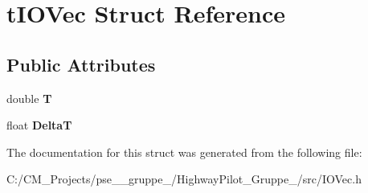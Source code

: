 \hypertarget{structt_i_o_vec}{}\section{t\+I\+O\+Vec Struct Reference}
\label{structt_i_o_vec}
\subsection*{Public Attributes}
\begin{DoxyCompactItemize}
\item 
\mbox{\label{structt_i_o_vec_a574678096931ac20b336a639997965fc}} 
double {\bfseries T}
\item 
\mbox{\label{structt_i_o_vec_a3ac90cd1a8280f296d5cf56b26856eda}} 
float {\bfseries DeltaT}
\end{DoxyCompactItemize}


The documentation for this struct was generated from the following file\+:\begin{DoxyCompactItemize}
\item 
C\+:/\+C\+M\+\_\+\+Projects/pse\+\_\+\_\+gruppe\+\_/\+Highway\+Pilot\+\_\+\+Gruppe\+\_/src/I\+O\+Vec.\+h\end{DoxyCompactItemize}
